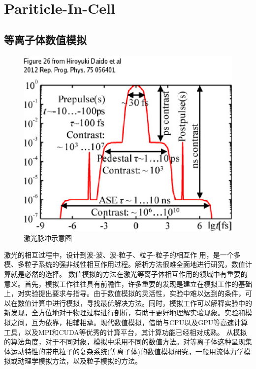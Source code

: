 
\chapter{Pariticle-In-Cell}
\label{chap:pic}

\section{等离子体数值模拟}
\begin{figure}[!htbp]
  \centering
  \includegraphics[width=\MyFactor\textwidth]{Img/prepulse2012.eps}
  \caption{激光脉冲示意图}
  \label{fig:prepulse2012}
\end{figure}

激光的相互过程中，设计到波-波、波-粒子、粒子-粒子的相互作
用，是一个多模、多粒子系统的强非线性相互作用过程。解析方法很难全面地进行研究，数值计算就是必然的选择。
数值模拟的方法在激光等离子体相互作用的领域中有重要的意义。首先，模拟工作往往具有前瞻性，许多重要的发现是建立在模拟工作的基础上，对实验提出要求与指导。由于数值模拟的灵活性，实验中难以达到的条件，可以在数值计算中进行模拟，寻找最优解决方法。同时，模拟工作可以解释实验中的新发现，全方位地对于物理过程进行剖析，有助于更好地理解实验现象。实验和模拟之间，互为依靠，相辅相承。现代数值模拟，借助与CPU以及GPU等高速计算工具，以及MPI和CUDA等优秀的计算平台，其计算功能已经相对成熟。
从模拟的算法角度，对于不同对象，模拟中采用不同的数值方法。对等离子体这种呈现集体运动特性的带电粒子的复杂系统(等离子体)的数值模拟研究，一般用流体力学模拟或动理学模拟方法，以及粒子模拟的方法。


